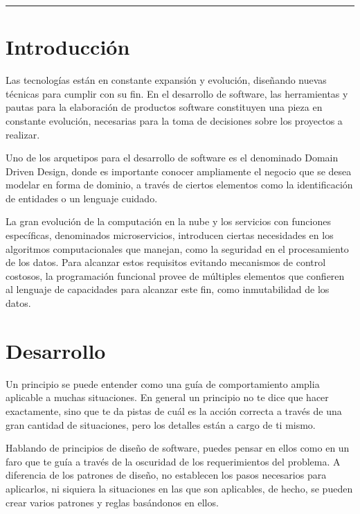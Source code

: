\documentclass{article}
\begin{document}
\begin{center}\rule{1\textwidth}{0.05mm} \end{center}


\begin{multicols}{2}
\section{Introducción}
 \quad Las tecnologías están en constante expansión y evolución, diseñando nuevas técnicas para cumplir con su fin. En el desarrollo de software, las herramientas y pautas para la elaboración de productos software constituyen una pieza en constante evolución, necesarias para la toma de decisiones sobre los proyectos a realizar. 
 
 Uno de los arquetipos para el desarrollo de software es el denominado Domain Driven Design, donde es importante conocer ampliamente el negocio que se desea modelar en forma de dominio, a través de ciertos elementos como la identificación de entidades o un lenguaje cuidado.
 
 La gran evolución de la computación en la nube y los servicios con funciones específicas, denominados microservicios, introducen ciertas necesidades en los algoritmos computacionales que manejan, como la seguridad en el procesamiento de los datos. Para alcanzar estos requisitos evitando mecanismos de control costosos, la programación funcional provee de múltiples elementos que confieren al lenguaje de capacidades para alcanzar este fin, como inmutabilidad de los datos.

\section{Desarrollo}
 \quad Un principio se puede entender como una guía de comportamiento amplia aplicable a muchas situaciones. En general un principio no te dice que hacer exactamente, sino que te da pistas de cuál es la acción correcta a través de una gran cantidad de situaciones, pero los detalles están a cargo de ti mismo.

Hablando de principios de diseño de software, puedes pensar en ellos como en un faro que te guía a través de la oscuridad de los requerimientos del problema. A diferencia de los patrones de diseño, no establecen los pasos necesarios para aplicarlos, ni siquiera la situaciones en las que son aplicables, de hecho, se pueden crear varios patrones y reglas basándonos en ellos.


\end{multicols}
\end{document}
